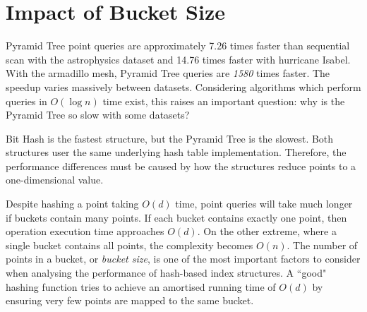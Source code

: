 \section{Impact of Bucket Size}

Pyramid Tree point queries are approximately 7.26 times faster than sequential scan with the astrophysics dataset and 14.76 times faster with hurricane Isabel. With the armadillo mesh, Pyramid Tree queries are \textit{1580} times faster. The speedup varies massively between datasets. Considering algorithms which perform queries in $O(\log n)$ time exist, this raises an important question: why is the Pyramid Tree so slow with some datasets?

Bit Hash is the fastest structure, but the Pyramid Tree is the slowest. Both structures user the same underlying hash table implementation. Therefore, the performance differences must be caused by how the structures reduce points to a one-dimensional value. 

Despite hashing a point taking $O(d)$ time, point queries will take much longer if buckets contain many points. If each bucket contains exactly one point, then operation execution time approaches $O(d)$. On the other extreme, where a single bucket contains all points, the complexity becomes $O(n)$. The number of points in a bucket, or \textit{bucket size}, is one of the most important factors to consider when analysing the performance of hash-based index structures. A ``good" hashing function tries to achieve an amortised running time of $O(d)$ by ensuring very few points are mapped to the same bucket.

